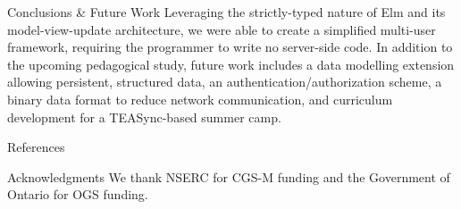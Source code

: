 \documentclass[22pt]{beamer}
\begin{document}
\begin{frame}[fragile]
\begin{textblock}{7.25}
        \begin{block}{\fontsize{37}{20}\selectfont Conclusions \& Future Work}
            Leveraging the strictly-typed nature of Elm and its model-view-update architecture, we were able
            to create a simplified multi-user framework, requiring the programmer to write no server-side code. In addition to the upcoming pedagogical study, future work includes a data modelling extension allowing persistent, structured data, an
            authentication/authorization scheme, a binary data format to reduce network communication, and
            curriculum development for a TEASync-based summer camp.
        \end{block}


        \begin{block}{\fontsize{37}{20}\selectfont References}
            
            {\fontsize{14}{15.75}\selectfont
                }
        \end{block}

        \begin{block}{\fontsize{37}{20}\selectfont Acknowledgments}
            We thank NSERC for CGS-M funding and the Government of Ontario for OGS funding.
        \end{block}


    \end{textblock}


\end{frame}
\end{document}
